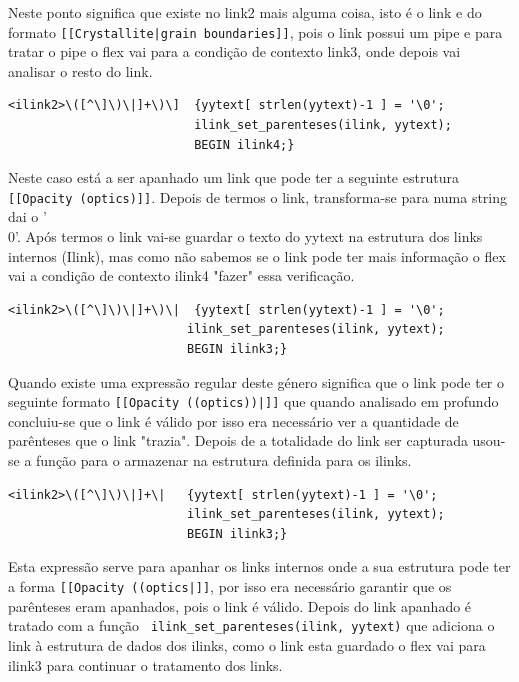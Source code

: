 \documentclass[11pt, a4paper, oneside]{article}
\begin{document}
Neste ponto significa que existe no link2 mais alguma coisa, isto é o link e do formato \texttt{[[Crystallite|grain boundaries]]}, pois o link possui um pipe e para tratar o pipe o flex vai para a condição de contexto link3, onde depois vai analisar o resto do link. 


\begin{verbatim}
<ilink2>\([^\]\)\|]+\)\]  {yytext[ strlen(yytext)-1 ] = '\0';
                          ilink_set_parenteses(ilink, yytext);
                          BEGIN ilink4;}

\end{verbatim}

Neste caso está a ser apanhado um link que pode ter a seguinte estrutura \texttt{[[Opacity (optics)]]}. Depois de termos o link,  transforma-se para numa string dai o '\\0'.
Após termos o link vai-se guardar o texto do yytext na estrutura dos links internos (Ilink), mas como não sabemos se o link pode ter mais informação o flex vai a condição de contexto ilink4 "fazer" essa verificação. 

\begin{verbatim}
<ilink2>\([^\]\)\|]+\)\|  {yytext[ strlen(yytext)-1 ] = '\0';
                         ilink_set_parenteses(ilink, yytext);
                         BEGIN ilink3;}
\end{verbatim}


Quando existe uma expressão regular deste género significa que o link pode ter o seguinte formato \texttt{[[Opacity ((optics))|]]} que quando analisado em profundo concluiu-se que o link é válido por isso era necessário ver a quantidade de parênteses que o link "trazia".
Depois de a totalidade do link ser capturada usou-se a função para o armazenar na estrutura definida para os ilinks.

\begin{verbatim}
<ilink2>\([^\]\)\|]+\|   {yytext[ strlen(yytext)-1 ] = '\0';
                         ilink_set_parenteses(ilink, yytext);
                         BEGIN ilink3;}
\end{verbatim}

Esta expressão serve para apanhar os links internos onde a sua estrutura pode ter a forma \texttt{[[Opacity ((optics|]]}, por isso era necessário garantir que os parênteses eram apanhados, pois o link é válido. 
Depois do link apanhado é tratado com a função \texttt{ ilink\_set\_parenteses(ilink, yytext)} que adiciona o link à estrutura de dados dos ilinks, como o link esta guardado o flex vai para ilink3 para continuar o tratamento dos links.
\end{document}
